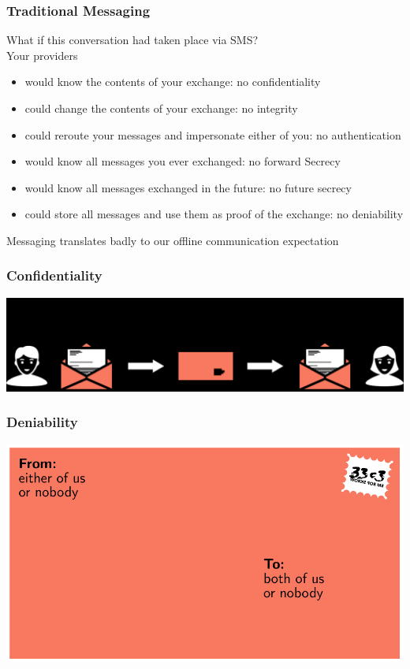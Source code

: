 \documentclass[
	aspectratio=169,
	xetex,
]{beamer}
\begin{document}
\begin{frame}
	\frametitle{Traditional Messaging}
	What if this conversation had taken place via SMS?\\[1em]
	Your providers
	\begin{itemize}
		\item would know the contents of your exchange: \alert{no confidentiality}
		\item could change the contents of your exchange: \alert{no integrity}
		\item could reroute your messages and impersonate either of you: \alert{no authentication}
		\item would know all messages you ever exchanged: \alert{no forward Secrecy}
		\item would know all messages exchanged in the future: \alert{no future secrecy}
		\item could store all messages and use them as proof of the exchange: \alert{no deniability}
	\end{itemize}
	Messaging translates badly to our offline communication expectation
\end{frame}

\begin{frame}
	\frametitle{Confidentiality}
	\centering
	\includegraphics[width=.8\textwidth]{img/confidentiality.pdf}
\end{frame}

\begin{frame}
	\frametitle{Deniability}
	\centering
	\includegraphics[width=.8\textwidth]{img/deniability-letter.pdf}
\end{frame}
\end{document}
